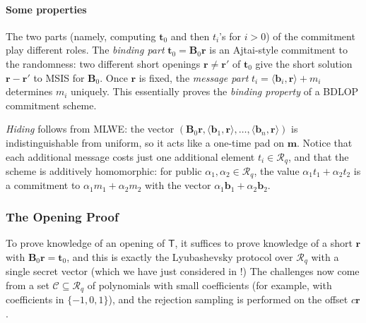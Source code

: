 \documentclass[../../book.tex]{subfiles}
\begin{document}
\paragraph{Some properties} The two parts (namely, computing $\mathbf{t}_0$ and then $t_i$'s for $i>0$) of the commitment play different roles.
The \emph{binding part} $\mathbf{t}_0 = \mathbf{B}_0\mathbf{r}$ is an Ajtai-style commitment to the randomness: two different short openings $\mathbf{r} \neq \mathbf{r}'$ of $\mathbf{t}_0$ give the short solution $\mathbf{r}-\mathbf{r}'$ to MSIS for $\mathbf{B}_0$.
Once $\mathbf{r}$ is fixed, the \emph{message part} $t_i = \langle \mathbf{b}_i, \mathbf{r} \rangle + m_i$ determines $m_i$ uniquely. 
This essentially proves the \emph{binding property} of a BDLOP commitment scheme.

\emph{Hiding} follows from MLWE: the vector $(\mathbf{B}_0\mathbf{r}, \langle \mathbf{b}_1,\mathbf{r}\rangle, \dots, \langle \mathbf{b}_n,\mathbf{r}\rangle)$ is indistinguishable from uniform, so it acts like a one-time pad on $\mathbf{m}$.
Notice that each additional message costs just one additional element $t_i \in \mathcal{R}_q$, and that the scheme is additively homomorphic: for public $\alpha_1, \alpha_2 \in \mathcal{R}_q$, the value $\alpha_1 t_1 + \alpha_2 t_2$ is a commitment to $\alpha_1 m_1 + \alpha_2 m_2$ with the vector $\alpha_1\mathbf{b}_1 + \alpha_2\mathbf{b}_2$.

\subsubsection{The Opening Proof}

To prove knowledge of an opening of $\mathsf{T}$, it suffices to prove knowledge of a short $\mathbf{r}$ with $\mathbf{B}_0\mathbf{r} = \mathbf{t}_0$, and this is exactly the Lyubashevsky protocol over $\mathcal{R}_q$ with a single secret vector (which we have just considered in !)
The challenges now come from a set $\mathcal{C} \subseteq \mathcal{R}_q$ of polynomials with small coefficients (for example, with coefficients in $\{-1,0,1\}$), and the rejection sampling is performed on the offset $c\mathbf{r}$.
\end{document}
